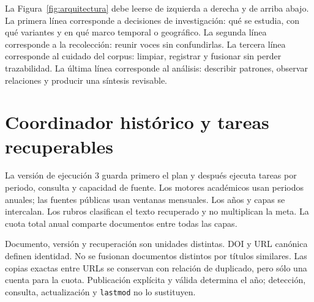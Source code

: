 \documentclass[11pt]{article}
\begin{document}
La Figura~\ref{fig:arquitectura} debe leerse de izquierda a derecha y de arriba
abajo. La primera línea corresponde a decisiones de investigación: qué se estudia, con qué
variantes y en qué marco temporal o geográfico. La segunda línea corresponde a
la recolección: reunir voces sin confundirlas. La tercera línea corresponde al
cuidado del corpus: limpiar, registrar y fusionar sin perder trazabilidad. La
última línea corresponde al análisis: describir patrones, observar relaciones y
producir una síntesis revisable.

\section{Coordinador histórico y tareas recuperables}

La versión de ejecución 3 guarda primero el plan y después ejecuta tareas
por periodo, consulta y capacidad de fuente. Los motores académicos usan
periodos anuales; las fuentes públicas usan ventanas mensuales. Los años y
capas se intercalan. Los rubros clasifican el texto recuperado y no multiplican
la meta. La cuota total anual comparte documentos entre todas las capas.

Documento, versión y recuperación son unidades distintas. DOI y URL canónica
definen identidad. No se fusionan documentos distintos por títulos similares.
Las copias exactas entre URLs se conservan con relación de duplicado, pero sólo
una cuenta para la cuota. Publicación explícita y válida determina el año;
detección, consulta, actualización y \texttt{lastmod} no lo sustituyen.
\end{document}
